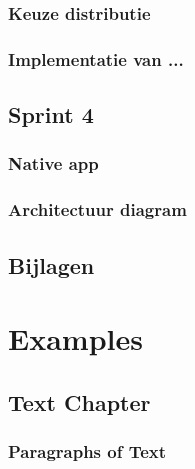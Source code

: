 \documentclass[11pt,fleqn,oneside,openany]{book} %
\begin{document}
\section{Keuze distributie}

\section{Implementatie van ...}

\chapter{Sprint 4}

\section{Native app}

\section{Architectuur diagram}


\chapter*{Bijlagen}



\part{Examples}



\chapter{Text Chapter}

\section{Paragraphs of Text}
\end{document}
